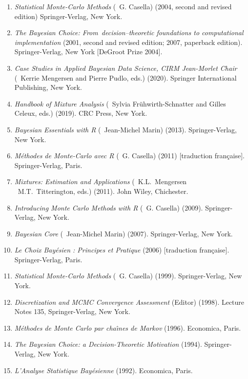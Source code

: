 \medskip
\begin{enumerate}
\renewcommand{\theenumi}{[L-\arabic{enumi}]}
\item {\it Statistical Monte-Carlo Methods} (\avec\ G. Casella) (2004, second and revised edition)
Springer-Verlag, New York.

\item {\it The Bayesian Choice: From~decision--theoretic foundations 
to computational implementation} (2001, second and revised edition; 2007,
paperback edition).  Springer-Verlag, New York [DeGroot Prize 2004].

\item {\em  Case Studies in Applied Bayesian Data Science, CIRM Jean-Morlet Chair} (\avec\ Kerrie Mengersen and Pierre Pudlo, eds.) (2020). Springer International Publishing, New York.

\item {\em Handbook of Mixture Analysis} (\avec\ Sylvia Fr\"uhwirth-Schnatter and Gilles Celeux, eds.) (2019).  CRC Press, New York.

\item {\em Bayesian Essentials with R} (\avec\ Jean-Michel Marin) (2013).  Springer-Verlag, New York.

\item {\em M\'ethodes de Monte-Carlo avec R} (\avec\ G. Casella) (2011) [traduction fran\c caise].
Springer-Verlag, Paris.

\item {\em Mixtures: Estimation and Applications} (\avec\ K.L.~Mengersen \et~M.T.~Titterington, eds.) (2011).
John Wiley, Chichester.

\item {\em Introducing Monte Carlo Methods with R} (\avec\ G. Casella) (2009).
Springer-Verlag, New York.

\item {\em Bayesian Core} (\avec\ Jean-Michel Marin) (2007).  Springer-Verlag, New York.

\item {\it Le Choix Bay\'esien : Principes et Pratique}
(2006) [traduction fran\c caise].  Springer-Verlag, Paris.

\item {\it Statistical Monte-Carlo Methods} (\avec\ G. Casella) (1999). 
Springer-Verlag, New York. 

\item {\it Discretization and MCMC Convergence Assessment}
(Editor) (1998). Lecture Notes 135, Springer-Verlag, New York. 

\item {\it M\'ethodes de Monte Carlo par cha\^\i nes de Markov} (1996).
Economica, Paris.

\item {\it The Bayesian Choice: a Decision-Theoretic Motivation} (1994). Springer-Verlag, New York.

\item {\it L'Analyse Statistique Bay\'esienne} (1992). Economica, Paris. 
\end{enumerate}

